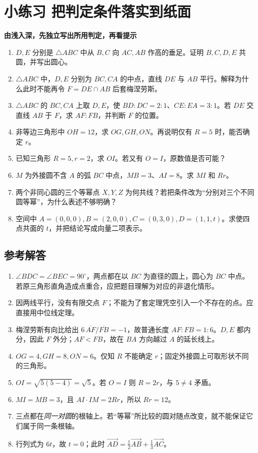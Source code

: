\documentclass[lang=cn,12pt,fontset=none,a4paper,openany]{beautybook}
\newcommand{\level}[1]{\par\smallskip\noindent\textcolor{coverfgcolor}{\textbf{#1}}\quad}
\begin{document}
\chapter{小练习 把判定条件落实到纸面}
\level{由浅入深，先独立写出所用判定，再看提示}
\begin{enumerate}
\item $D,E$ 分别是 $\triangle ABC$ 中从 $B,C$ 向 $AC,AB$ 作高的垂足。证明 $B,C,D,E$ 共圆，并写出圆心。
\item $\triangle ABC$ 中，$D,E$ 分别为 $BC,CA$ 的中点，直线 $DE$ 与 $AB$ 平行。解释为什么此时不能再令 $F=DE\cap AB$ 后套梅涅劳斯。
\item $\triangle ABC$ 的 $BC,CA$ 上取 $D,E$，使 $BD:DC=2:1$、$CE:EA=3:1$。若 $DE$ 交直线 $AB$ 于 $F$，求 $AF:FB$，并判断 $F$ 的位置。
\item 非等边三角形中 $OH=12$，求 $OG,GH,ON$。再说明仅有 $R=5$ 时，能否确定 $r$。
\item 已知三角形 $R=5,r=2$，求 $OI$。若又有 $O=I$，原数值是否可能？
\item $M$ 为外接圆不含 $A$ 的弧 $BC$ 中点，$MB=3$、$AI=8$。求 $MI$ 和 $Rr$。
\item 两个非同心圆的三个等幂点 $X,Y,Z$ 为何共线？若把条件改为“分别对三个不同圆等幂”，为什么表述不够明确？
\item 空间中 $A=(0,0,0),B=(2,0,0),C=(0,3,0),D=(1,1,t)$。求使四点共面的 $t$，并把结论写成向量二项表示。
\end{enumerate}

\section{参考解答}
\begin{enumerate}
\item $\angle BDC=\angle BEC=90^\circ$，两点都在以 $BC$ 为直径的圆上，圆心为 $BC$ 中点。若原三角形直角造成点重合，应把题目理解为对应的非退化情形。
\item 因两线平行，没有有限交点 $F$；不能为了套定理凭空引入一个不存在的点。应直接用中位线定理。
\item 梅涅劳斯有向比给出 $6\,\overline{AF}/\overline{FB}=-1$，故普通长度 $AF:FB=1:6$。$D,E$ 都内分，因此 $F$ 外分；$AF<FB$，故在 $BA$ 方向越过 $A$ 的延长线上。
\item $OG=4,GH=8,ON=6$。仅知 $R$ 不能确定 $r$；固定外接圆上可取形状不同的三角形。
\item $OI=\sqrt{5(5-4)}=\sqrt5$。若 $O=I$ 则 $R=2r$，与 $5\ne4$ 矛盾。
\item $MI=MB=3$，且 $AI\cdot IM=2Rr$，所以 $Rr=12$。
\item 三点都在\emph{同一对圆}的根轴上。若“等幂”所比较的圆对随点改变，就不能保证它们属于同一条根轴。
\item 行列式为 $6t$，故 $t=0$；此时 $\overrightarrow{AD}=\tfrac12\overrightarrow{AB}+\tfrac13\overrightarrow{AC}$。
\end{enumerate}
\end{document}
